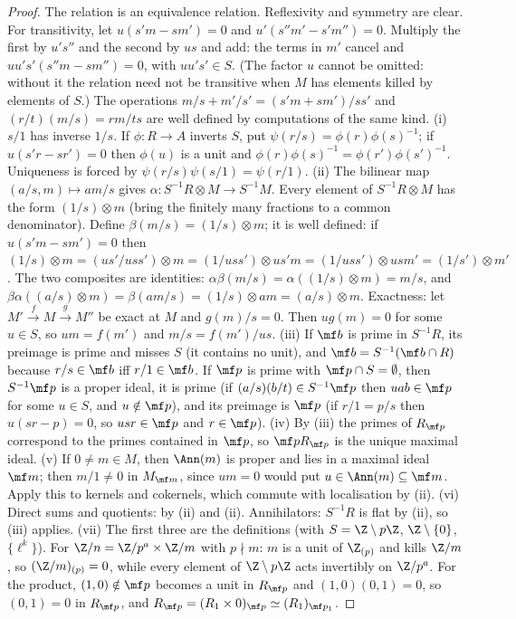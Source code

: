 \begin{proof}
The relation is an equivalence relation. Reflexivity and symmetry are clear. For transitivity, let $u(s'm-sm')=0$ and
$u'(s''m'-s'm'')=0$. Multiply the first by $u's''$ and the second by $us$ and add: the terms in $m'$ cancel and $uu's'(s''m-sm'')=0$, with
$uu's'\in S$. (The factor $u$ cannot be omitted: without it the relation need not be transitive when $M$ has elements killed by
elements of $S$.) The operations $m/s+m'/s'=(s'm+sm')/ss'$ and $(r/t)(m/s)=rm/ts$ are well defined by computations of the same kind.
(i) $s/1$ has inverse $1/s$. If $\phi\colon R\to A$ inverts $S$, put $\psi(r/s)=\phi(r)\phi(s)^{-1}$; if $u(s'r-sr')=0$ then
$\phi(u)$ is a unit and $\phi(r)\phi(s)^{-1}=\phi(r')\phi(s')^{-1}$. Uniqueness is forced by $\psi(r/s)\psi(s/1)=\psi(r/1)$.
(ii) The bilinear map $(a/s,m)\mapsto am/s$ gives $\alpha\colon S^{-1}R\otimes M\to S^{-1}M$. Every element of $S^{-1}R\otimes M$ has the form
$(1/s)\otimes m$ (bring the finitely many fractions to a common denominator). Define $\beta(m/s)=(1/s)\otimes m$; it is well
defined: if $u(s'm-sm')=0$ then $(1/s)\otimes m=(us'/uss')\otimes m=(1/uss')\otimes us'm=(1/uss')\otimes usm'=(1/s')\otimes m'$. The two
composites are identities: $\alpha\beta(m/s)=\alpha((1/s)\otimes m)=m/s$, and $\beta\alpha((a/s)\otimes m)=\beta(am/s)=(1/s)\otimes am=(a/s)\otimes m$. Exactness: let $M'\xrightarrow{f}M\xrightarrow{g}M''$ be exact at $M$ and $g(m)/s=0$. Then $ug(m)=0$ for some
$u\in S$, so $um=f(m')$ and $m/s=f(m')/us$.
(iii) If $\mf b$ is prime in $S^{-1}R$, its preimage is prime and misses $S$ (it contains no unit), and $\mf b=S^{-1}(\mf b\cap R)$
because $r/s\in\mf b$ iff $r/1\in\mf b$. If $\mf p$ is prime with $\mf p\cap S=\emptyset$, then $S^{-1}\mf p$ is a proper ideal, it is prime
(if $(a/s)(b/t)\in S^{-1}\mf p$ then $uab\in\mf p$ for some $u\in S$, and $u\notin\mf p$), and its preimage is $\mf p$ (if $r/1=p/s$ then
$u(sr-p)=0$, so $usr\in\mf p$ and $r\in\mf p$).
(iv) By (iii) the primes of $R_{\mf p}$ correspond to the primes contained in $\mf p$, so $\mf pR_{\mf p}$ is the unique maximal ideal.
(v) If $0\ne m\in M$, then $\Ann(m)$ is proper and lies in a maximal ideal $\mf m$; then $m/1\ne0$ in $M_{\mf m}$, since $um=0$ would put
$u\in\Ann(m)\subseteq\mf m$. Apply this to kernels and cokernels, which commute with localisation by (ii).
(vi) Direct sums and quotients: by (ii) and (ii). Annihilators: $S^{-1}R$ is flat by (ii), so
(iii) applies.
(vii) The first three are the definitions (with $S=\Z\setminus p\Z$, $\Z\setminus\{0\}$, $\{\ell^k\}$). For $\Z/n=\Z/p^a\times\Z/m$ with $p\nmid m$: $m$
is a unit of $\Z_{(p)}$ and kills $\Z/m$, so $(\Z/m)_{(p)}=0$, while every element of $\Z\setminus p\Z$ acts invertibly on $\Z/p^a$. For the
product, $(1,0)\notin\mf p$ becomes a unit in $R_{\mf p}$ and $(1,0)(0,1)=0$, so $(0,1)=0$ in $R_{\mf p}$, and $R_{\mf p}=(R_1\times0)_{\mf p}\simeq(R_1)_{\mf p_1}$.
\end{proof}

